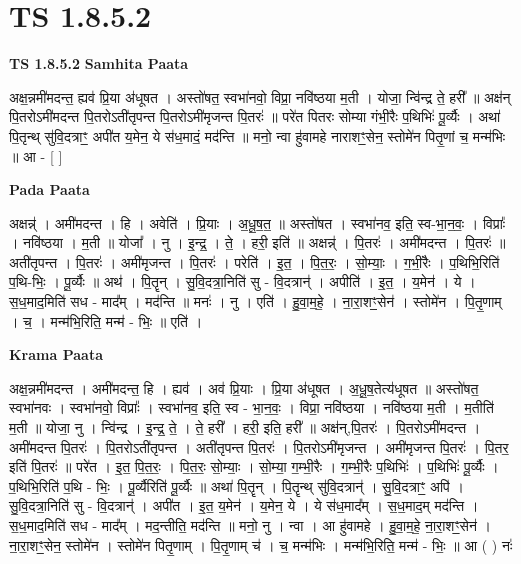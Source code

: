 \documentclass[17pt]{extarticle}
\begin{document}
\section{ TS 1.8.5.2 }

\textbf{TS 1.8.5.2 } \newline
\textbf{Samhita Paata} \newline

अक्ष॒न्नमी॑मदन्त॒ ह्यव॑ प्रि॒या अ॑धूषत । अस्तो॑षत॒ स्वभा॑नवो॒ विप्रा॒ नवि॑ष्ठया म॒ती । योजा॒ न्वि॑न्द्र ते॒ हरी᳚ ॥ अक्ष॑न् पि॒तरोऽमी॑मदन्त पि॒तरोऽती॑तृपन्त पि॒तरोऽमी॑मृजन्त पि॒तरः॑ ॥ परे॑त पितरः सोम्या गंभी॒रैः प॒थिभिः॑ पू॒र्व्यैः । अथा॑ पि॒तृन्थ् सु॑वि॒दत्राꣳ॒॒ अपी॑त य॒मेन॒ ये स॑ध॒मादं॒ मद॑न्ति ॥ मनो॒ न्वा हु॑वामहे नाराशꣳ॒॒सेन॒ स्तोमे॑न पितृ॒णां च॒ मन्म॑भिः ॥ आ - [ ] \newline

\textbf{Pada Paata} \newline

अक्षन्न्॑ । अमी॑मदन्त । हि । अवेति॑ । प्रि॒याः । अ॒धू॒ष॒त॒ ॥ अस्तो॑षत । स्वभा॑नव॒ इति॒ स्व-भा॒न॒वः॒ । विप्राः᳚ । नवि॑ष्ठया । म॒ती ॥ योजा᳚ । नु । इ॒न्द्र॒ । ते॒ । हरी॒ इति॑ ॥ अक्षन्न्॑ । पि॒तरः॑ । अमी॑मदन्त । पि॒तरः॑ ॥ अती॑तृपन्त । पि॒तरः॑ । अमी॑मृजन्त । पि॒तरः॑ । परेति॑ । इ॒त॒ । पि॒त॒रः॒ । सो॒म्याः॒ । ग॒भीं॒रैः । प॒थिभि॒रिति॑ प॒थि-भिः॒ । पू॒र्व्यैः ॥ अथ॑ । पि॒तॄन् । सु॒वि॒दत्रा॒निति॑ सु - वि॒दत्रान्॑ । अपीति॑ । इ॒त॒ । य॒मेन॑ । ये । स॒ध॒माद॒मिति॑ सध - माद᳚म् । मद॑न्ति ॥ मनः॑ । नु । एति॑ । हु॒वा॒म॒हे॒ । ना॒रा॒शꣳ॒॒सेन॑ । स्तोमे॑न । पि॒तृ॒णाम् । च॒ । मन्म॑भि॒रिति॒ मन्म॑ - भिः॒ ॥ एति॑ ।  \newline


\textbf{Krama Paata} \newline

अक्ष॒न्नमी॑मदन्त । अमी॑मदन्त॒ हि । ह्यव॑ । अव॑ प्रि॒याः । प्रि॒या अ॑धूषत । अ॒धू॒ष॒तेत्य॑धूषत ॥ अस्तो॑षत॒ स्वभा॑नवः । स्वभा॑नवो॒ विप्राः᳚ । स्वभा॑नव॒ इति॒ स्व - भा॒न॒वः॒ । विप्रा॒ नवि॑ष्ठया । नवि॑ष्ठया म॒ती । म॒तीति॑ म॒ती ॥ योजा॒ नु । न्वि॑न्द्र । इ॒न्द्र॒ ते॒ । ते॒ हरी᳚ । हरी॒ इति॒ हरी᳚ ॥ अक्ष॑न्,पि॒तरः॑ । पि॒तरोऽमी॑मदन्त । अमी॑मदन्त पि॒तरः॑ । पि॒तरोऽती॑तृपन्त । अती॑तृपन्त पि॒तरः॑ । पि॒तरोऽमी॑मृजन्त । अमी॑मृजन्त पि॒तरः॑ । पि॒तर॒ इति॑ पि॒तरः॑ ॥ परे॑त । इ॒त॒ पि॒त॒रः॒ । पि॒त॒रः॒ सो॒म्याः॒ । सो॒म्या॒ ग॒म्भी॒रैः । ग॒म्भी॒रैः प॒थिभिः॑ । प॒थिभिः॑ पू॒र्व्यैः । प॒थिभि॒रिति॑ प॒थि - भिः॒ । पू॒र्व्यैरिति॑ पू॒र्व्यैः ॥ अथा॑ पि॒तॄन् । पि॒तॄन्थ् सु॑वि॒दत्रान्॑ । सु॒वि॒दत्राꣳ॒॒ अपि॑ । सु॒वि॒दत्रा॒निति॑ सु - वि॒दत्रान्॑ । अपी॑त । इ॒त॒ य॒मेन॑ । य॒मेन॒ ये । ये स॑ध॒माद᳚म् । स॒ध॒माद॒म् मद॑न्ति । स॒ध॒माद॒मिति॑ सध - माद᳚म् । मद॒न्तीति॒ मद॑न्ति ॥ मनो॒ नु । न्वा । आ हु॑वामहे । हु॒वा॒म॒हे॒ ना॒रा॒शꣳ॒॒सेन॑ । ना॒रा॒शꣳ॒॒सेन॒ स्तोमे॑न । स्तोमे॑न पितृ॒णाम् । पि॒तृ॒णाम् च॑ । च॒ मन्म॑भिः । मन्म॑भि॒रिति॒ मन्म॑ - भिः॒ ॥ आ ( ) नः॑ \newline
\end{document}
